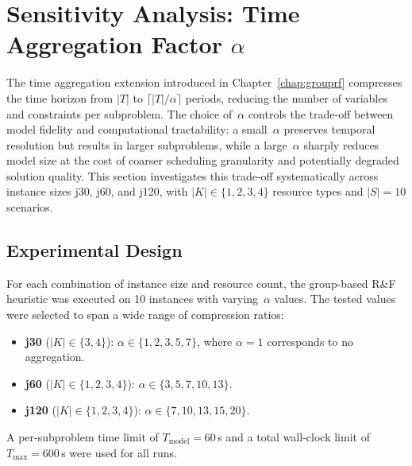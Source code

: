 \section{Sensitivity Analysis: Time Aggregation Factor $\alpha$}
\label{sec:alpha_sensitivity}
The time aggregation extension introduced in
Chapter~\ref{chap:grouprf} compresses the time horizon from
$|T|$ to $\lceil |T| / \alpha \rceil$ periods, reducing the
number of variables and constraints per subproblem. The choice
of~$\alpha$ controls the trade-off between model fidelity and
computational tractability: a small~$\alpha$ preserves temporal
resolution but results in larger subproblems, while a
large~$\alpha$ sharply reduces model size at the cost of
coarser scheduling granularity and potentially degraded solution
quality. This section investigates this trade-off systematically
across instance sizes j30, j60, and j120, with
$|K| \in \{1, 2, 3, 4\}$ resource types and $|S| = 10$
scenarios.
\subsection{Experimental Design}
\label{subsec:alpha_design}
For each combination of instance size and resource count, the
group-based R\&F heuristic was executed on 10 instances with
varying~$\alpha$ values. The tested values were selected to span
a wide range of compression ratios:
\begin{itemize}
  \item \textbf{j30} ($|K| \in \{3, 4\}$):
        $\alpha \in \{1, 2, 3, 5, 7\}$, where $\alpha = 1$
        corresponds to no aggregation.
  \item \textbf{j60} ($|K| \in \{1, 2, 3, 4\}$):
        $\alpha \in \{3, 5, 7, 10, 13\}$.
  \item \textbf{j120} ($|K| \in \{1, 2, 3, 4\}$):
        $\alpha \in \{7, 10, 13, 15, 20\}$.
\end{itemize}
\noindent
A per-subproblem time limit of $T_{\mathrm{model}} = 60$\,s and
a total wall-clock limit of $T_{\max} = 600$\,s were used for
all runs.
